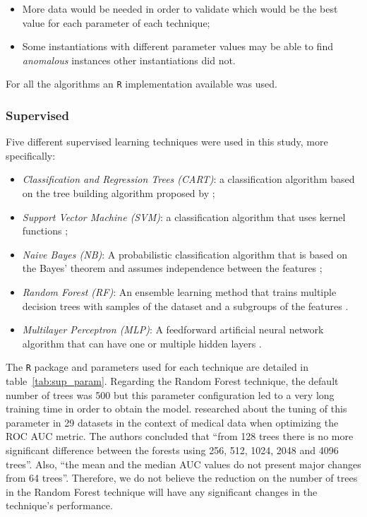 \begin{itemize}
	\item More data would be needed in order to validate which would be the best value for each parameter of each technique;
	\item Some instantiations with different parameter values may be able to find \textit{anomalous} instances other instantiations did not.
\end{itemize}

For all the algorithms an \verb|R| implementation available was used.

\subsubsection{Supervised}

Five different supervised learning techniques were used in this study, more specifically:

\begin{itemize}
	\item \textit{Classification and Regression Trees (CART)}: a classification algorithm based on the tree building algorithm proposed by \textcite{breiman1984classification};
	
	\item \textit{Support Vector Machine (SVM)}: a classification algorithm that uses kernel functions \cite{708428};
	
	\item \textit{Naive Bayes (NB)}: A probabilistic classification algorithm that is based on the Bayes' theorem and assumes independence between the features \cite{mccallum1998comparison};
	
	\item \textit{Random Forest (RF)}: An ensemble learning method that trains multiple decision trees with samples of the dataset and a subgroups of the features \cite{liaw2002classification}.
	
	\item \textit{Multilayer Perceptron (MLP)}: A feedforward artificial neural network algorithm that can have one or multiple hidden layers \cite{rumelhart1988learning}.
\end{itemize}

The \verb|R| package and parameters used for each technique are detailed in table~\ref{tab:sup_param}.
Regarding the Random Forest technique, the default number of trees was 500 but this parameter configuration led to a very long training time in order to obtain the model.
\textcite{rumelhart1988learning} researched about the tuning of this parameter in 29 datasets in the context of medical data when optimizing the ROC AUC metric.
The authors concluded that ``from 128 trees there is no more significant difference between the forests using 256, 512, 1024, 2048 and 4096 trees''.
Also, ``the mean and the median AUC values do not present major changes from 64 trees''.
Therefore, we do not believe the reduction on the number of trees in the Random Forest technique will have any significant changes in the technique's performance.

